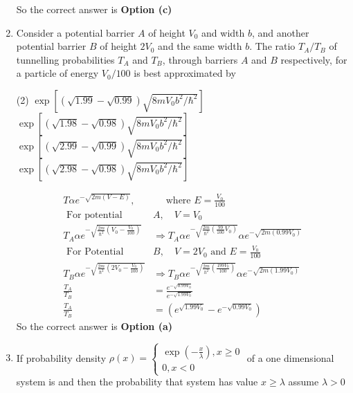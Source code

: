 \begin{enumerate}
\begin{answer}
So the correct answer is \textbf{Option (c)}
\end{answer}
\item Consider a potential barrier $A$ of height $V_{0}$ and width $b$, and another potential barrier $B$ of height $2 V_{0}$ and the same width $b$. The ratio $T_{A} / T_{B}$ of tunnelling probabilities $T_{A}$ and $T_{B}$, through barriers $A$ and $B$ respectively, for a particle of energy $V_{0} / 100$ is best approximated by
 \begin{tasks}(2)
	\task[\textbf{a.}]$\exp \left[(\sqrt{1.99}-\sqrt{0.99}) \sqrt{8 m V_{0} b^{2} / \hbar^{2}}\right]$
	\task[\textbf{b.}]$\exp \left[(\sqrt{1.98}-\sqrt{0.98}) \sqrt{8 m V_{0} b^{2} / \hbar^{2}}\right]$
	\task[\textbf{c.}]$\exp \left[(\sqrt{2.99}-\sqrt{0.99}) \sqrt{8 m V_{0} b^{2} / \hbar^{2}}\right]$
	\task[\textbf{d.}] $\exp \left[(\sqrt{2.98}-\sqrt{0.98}) \sqrt{8 m V_{0} b^{2} / \hbar^{2}}\right]$
\end{tasks}
\begin{answer}
	$$
	\begin{aligned}
	T \alpha e^{-\sqrt{2 m(V-E)}}, &\quad \text { where } E=\frac{V_{0}}{100}\\
	\text { For potential } &A, \quad V=V_{0}\\
	T_{A} \alpha e^{-\sqrt{\frac{2 m}{\hbar^{2}}\left(V_{0}-\frac{V_{0}}{100}\right)}} &\Rightarrow T_{A} \alpha e^{-\sqrt{\frac{2 m}{\hbar^{2}}\left(\frac{99}{100} V_{0}\right)}} \alpha e^{-\sqrt{2 m\left(0.99 V_{0}\right)}}\\
	\text { For Potential } &B, \quad V=2 V_{0} \text { and } E=\frac{V_{0}}{100}\\
	T_{B} \alpha e^{-\sqrt{\frac{2 m}{\hbar^{2}}\left(2 V_{0}-\frac{V_{0}}{100}\right)}} &\Rightarrow T_{B} \alpha e^{-\sqrt{\frac{2 m}{h^{2}}\left(\frac{199 V_{0}}{100}\right)}} \alpha e^{-\sqrt{2 m\left(1.99 V_{0}\right)}}\\
	\frac{T_{A}}{T_{B}}&=\frac{e^{-\sqrt{0.99 V_{0}}}}{e^{-\sqrt{1.99 V_{0}}}}\\
	\frac{T_{A}}{T_{B}}&=\left(e^{\sqrt{1.99 V_{0}}}-e^{-\sqrt{0.99 V_{0}}}\right)
\end{aligned}
$$
So the correct answer is \textbf{Option (a)}
\end{answer}
\item If probability density $\rho(x)=\left\{\begin{array}{c}\exp \left(-\frac{x}{\lambda}\right), x \geq 0 \\ 0, x<0\end{array}\right.$ of a one dimensional system is and then the probability that system has value $x \geq \lambda$ assume $\lambda>0$

\end{enumerate}
